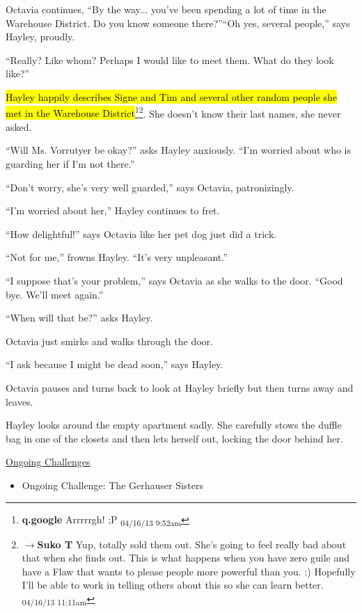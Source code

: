 Octavia continues, ``By the way... you've been spending a lot of time in the Warehouse District.  Do you know someone there?''``Oh yes, several people,'' says Hayley, proudly.

``Really? Like whom?  Perhaps I would like to meet them.  What do they look like?''

\hl{Hayley happily describes Signe and Tim and several other random people she met in the Warehouse District}\footnote{\textbf{q.google }Arrrrrgh! ;P \textsubscript{04/16/13 9:52am}}\footnote{$\rightarrow$\textbf{Suko T }Yup, totally sold them out.  She's going to feel really bad about that when she finds out. This is what happens when you have zero guile and have a Flaw that wants to please people more powerful than you. :)  Hopefully I'll be able to work in telling others about this so she can learn better. \textsubscript{04/16/13 11:11am}}.  She doesn't know their last names, she never asked.

``Will Ms. Vorrutyer be okay?'' asks Hayley anxiously.  ``I'm worried about who is guarding her if I'm not there.''

``Don't worry, she's very well guarded,'' says Octavia, patronizingly.

``I'm worried about her,'' Hayley continues to fret.

``How delightful!'' says Octavia like her pet dog just did a trick.

``Not for me,'' frowns Hayley.  ``It's very unpleasant.''

``I suppose that's your problem,'' says Octavia as she walks to the door.  ``Good bye.  We'll meet again.''

``When will that be?'' asks Hayley.

Octavia just smirks and walks through the door.

``I ask because I might be dead soon,'' says Hayley.

Octavia pauses and turns back to look at Hayley briefly but then turns away and leaves.



Hayley looks around the empty apartment sadly.  She carefully stows the duffle bag in one of the closets and then lets herself out, locking the door behind her.



\underline{  {\LARGE Ongoing Challenges }  }

\begin{itemize}
\item Ongoing Challenge: The Gerhauser Sisters 
\end{itemize}

